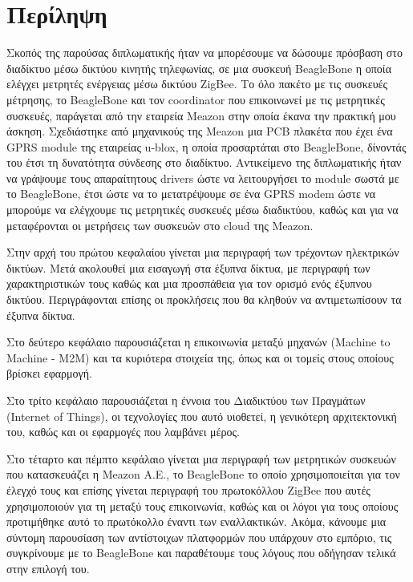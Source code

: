 \documentclass[12pt, a4paper, oneside]{report}
\begin{document}
\maketitle
\clearpage
{}
\setcounter{page}{2}
\section*{Περίληψη}
Σκοπός της παρούσας διπλωματικής ήταν να μπορέσουμε να δώσουμε πρόσβαση στο διαδίκτυο μέσω δικτύου κινητής τηλεφωνίας, σε μια συσκευή BeagleBone η οποία ελέγχει μετρητές ενέργειας μέσω δικτύου ZigBee. Το όλο πακέτο με τις συσκευές μέτρησης, το BeagleBone και τον coordinator που επικοινωνεί με τις μετρητικές συσκευές, παράγεται από την εταιρεία Meazon στην οποία έκανα την πρακτική μου άσκηση. Σχεδιάστηκε από μηχανικούς της Meazon μια PCB πλακέτα που έχει ένα GPRS module της εταιρείας u-blox, η οποία προσαρτάται στο BeagleBone, δίνοντάς του έτσι τη δυνατότητα σύνδεσης στο διαδίκτυο. Αντικείμενο της διπλωματικής ήταν να γράψουμε τους απαραίτητους drivers ώστε να λειτουργήσει το module σωστά με το BeagleBone, έτσι ώστε να το μετατρέψουμε σε ένα GPRS modem ώστε να μπορούμε να ελέγχουμε τις μετρητικές συσκευές μέσω διαδικτύου, καθώς και για να μεταφέρονται οι μετρήσεις των συσκευών στο cloud της Meazon.

Στην αρχή του πρώτου κεφαλαίου γίνεται μια περιγραφή των τρέχοντων ηλεκτρικών δικτύων. Μετά ακολουθεί μια εισαγωγή στα έξυπνα δίκτυα, με περιγραφή των χαρακτηριστικών τους καθώς και μια προσπάθεια για τον ορισμό ενός έξυπνου δικτύου. Περιγράφονται επίσης οι προκλήσεις που θα κληθούν να αντιμετωπίσουν τα έξυπνα δίκτυα.

Στο δεύτερο κεφάλαιο παρουσιάζεται η επικοινωνία μεταξύ μηχανών (Machine to Machine - M2M) και τα κυριότερα στοιχεία της, όπως και οι τομείς στους οποίους βρίσκει εφαρμογή.

Στο τρίτο κεφάλαιο παρουσιάζεται η έννοια του Διαδικτύου των Πραγμάτων (Internet of Things), οι τεχνολογίες που αυτό υιοθετεί, η γενικότερη αρχιτεκτονική του, καθώς και οι εφαρμογές που λαμβάνει μέρος.

Στο τέταρτο και πέμπτο κεφάλαιο γίνεται μια περιγραφή των μετρητικών συσκευών που κατασκευάζει η Meazon Α.Ε., το BeagleBone το οποίο χρησιμοποιείται για τον έλεγχό τους και επίσης γίνεται περιγραφή του πρωτοκόλλου ZigBee που αυτές χρησιμοποιούν για τη μεταξύ τους επικοινωνία, καθώς και οι λόγοι για τους οποίους προτιμήθηκε αυτό το πρωτόκολλο έναντι των εναλλακτικών. Ακόμα, κάνουμε μια σύντομη παρουσίαση  των αντίστοιχων πλατφορμών που υπάρχουν στο εμπόριο, τις συγκρίνουμε με το BeagleBone και παραθέτουμε τους λόγους που οδήγησαν τελικά στην επιλογή του.
\end{document}
